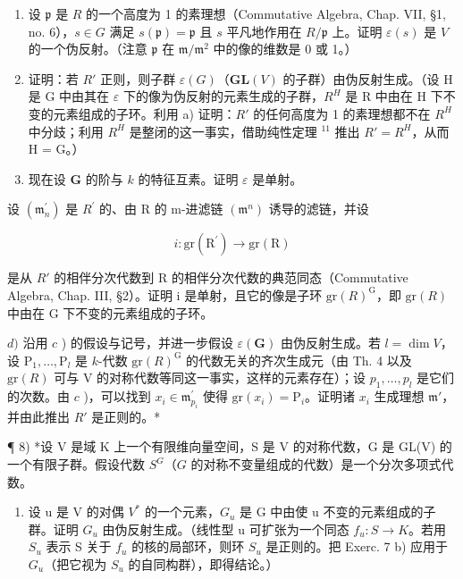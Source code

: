 \begin{enumerate}
\def\labelenumi{\alph{enumi})}
\item
  设 \(\mathfrak{p}\) 是 \(R\) 的一个高度为 1 的素理想（Commutative Algebra, Chap. VII, §1, no. 6），\(s \in G\) 满足 \(s(\mathfrak{p}) = \mathfrak{p}\) 且 \(s\) 平凡地作用在 \(R / \mathfrak{p}\) 上。证明 \(\varepsilon(s)\) 是 \(V\) 的一个伪反射。（注意 \(\mathfrak{p}\) 在 \(\mathfrak{m} / \mathfrak{m}^2\) 中的像的维数是 0 或 1。）
\item
  证明：若 \(R'\) 正则，则子群 \(\varepsilon(G)\)（\(\mathbf{GL}(V)\) 的子群）由伪反射生成。（设 H 是 G 中由其在 \(\varepsilon\) 下的像为伪反射的元素生成的子群，\(R^{H}\) 是 R 中由在 H 下不变的元素组成的子环。利用 a) 证明：\(R'\) 的任何高度为 1 的素理想都不在 \(R^{H}\) 中分歧；利用 \(R^{H}\) 是整闭的这一事实，借助纯性定理 \(^{11}\) 推出 \(R' = R^{H}\)，从而 H = G。）
\item
  现在设 \(\mathbf{G}\) 的阶与 \(k\) 的特征互素。证明 \(\varepsilon\) 是单射。
\end{enumerate}

设 \((\mathfrak{m}_{n}^{\prime})\) 是 \(R^{\prime}\) 的、由 R 的 m-进滤链 \((\mathfrak{m}^{n})\) 诱导的滤链，并设

\[
i: \mathrm{gr} (\mathrm{R} ^ {\prime}) \to \mathrm{gr} (\mathrm{R})
\]

是从 \(R'\) 的相伴分次代数到 R 的相伴分次代数的典范同态（Commutative Algebra, Chap. III, §2）。证明 i 是单射，且它的像是子环 \(\mathrm{gr}(R)^{\mathrm{G}}\)，即 \(\mathrm{gr}(R)\) 中由在 G 下不变的元素组成的子环。

\(d)\) 沿用 \(c\) ) 的假设与记号，并进一步假设 \(\varepsilon (\mathbf{G})\) 由伪反射生成。若 \(l = \dim V\)，设 \(\mathrm{P}_1,\ldots ,\mathrm{P}_l\) 是 \(k\)-代数 \(\mathrm{gr}(R)^{\mathrm{G}}\) 的代数无关的齐次生成元（由 Th. 4 以及 \(\mathrm{gr}(R)\) 可与 V 的对称代数等同这一事实，这样的元素存在）；设 \(p_1,\ldots ,p_l\) 是它们的次数。由 \(c\) )，可以找到 \(x_{i}\in \mathfrak{m}_{p_{i}}^{\prime}\) 使得 \(\mathrm{gr}(x_i) = \mathrm{P}_i\)。证明诸 \(x_{i}\) 生成理想 \(\mathfrak{m}'\)，并由此推出 \(R'\) 是正则的。*

¶ 8) *设 V 是域 K 上一个有限维向量空间，S 是 V 的对称代数，G 是 GL(V) 的一个有限子群。假设代数 \(S^G\)（\(G\) 的对称不变量组成的代数）是一个分次多项式代数。

\begin{enumerate}
\def\labelenumi{\alph{enumi})}
\tightlist
\item
  设 u 是 V 的对偶 \(V^{*}\) 的一个元素，\(G_{u}\) 是 G 中由使 u 不变的元素组成的子群。证明 \(G_{u}\) 由伪反射生成。（线性型 u 可扩张为一个同态 \(f_{u}: S \to K\)。若用 \(S_{u}\) 表示 S 关于 \(f_{u}\) 的核的局部环，则环 \(S_{u}\) 是正则的。把 Exerc. 7 b) 应用于 \(G_{u}\)（把它视为 \(S_{u}\) 的自同构群），即得结论。）
\end{enumerate}

